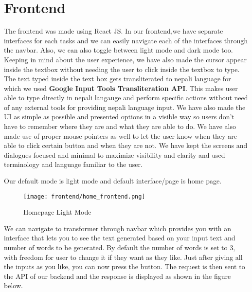 \chapter{Frontend}
The frontend was made using React JS. In our frontend,we have separate interfaces for each tasks and we can easily navigate each of the interfaces through the navbar. Also, we can also toggle between light mode and dark mode too. Keeping in mind about the user experience, we have also made the cursor appear inside the textbox without needing the user to click inside the textbox to type. The text typed inside the text box gets transliterated to nepali language for which we used \textbf{Google Input Tools Transliteration API}. This makes user able to type directly in nepali langauge and perform specific actions without need of any external tools for providing nepali language input. We have also made the UI as simple as possible and presented options in a visible way so users don’t have to remember where they are and what they are able to do. We have also made use of proper mouse pointers as well to let the user know when they are able to click certain button and when they are not. We have kept the screens and dialogues focused and minimal to maximize visibility and clarity and used terminology and language familiar to the user. 

Our default mode is light mode and default interface/page is home page. 

\begin{figure}[H]
    \centering
    \texttt{[image: frontend/home\_frontend.png]}
    \caption{Homepage Light Mode}
    \label{fig: Homepage Light Mode}
\end{figure}



We can navigate to transformer through navbar which provides you with an interface that lets you to see the text generated based on your input text and number of words to be generated. By default the number of words is set to 3, with freedom for user to change it if they want as they like. Just after giving all the inputs as you like, you can now press the button. The request is then sent to the API of our backend and the response is displayed as shown in the figure below.

